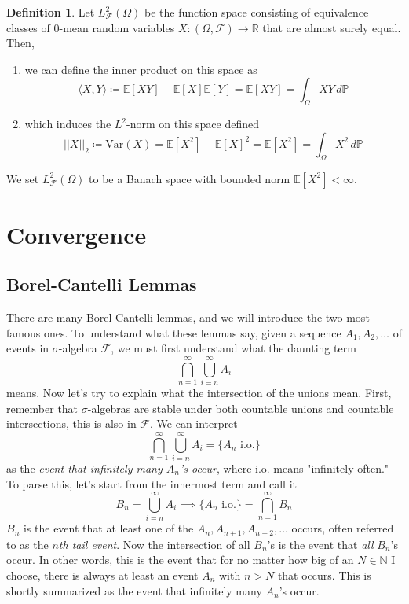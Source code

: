 \documentclass{article}
\theoremstyle{definition}
\theoremstyle{remark}
\theoremstyle{definition}
\newtheorem{definition}{Definition}[section]
\begin{document}
\begin{definition}
Let $L^2_\mathcal{F} (\Omega)$ be the function space consisting of equivalence classes of $0$-mean random variables $X: (\Omega, \mathcal{F}) \rightarrow \mathbb{R}$ that are almost surely equal. Then, 
\begin{enumerate}
    \item we can define the inner product on this space as 
    \[\langle X, Y \rangle \coloneqq \mathbb{E}[X Y] - \mathbb{E}[X] \mathbb{E}[Y] = \mathbb{E}[X Y] = \int_\Omega X Y \,d\mathbb{P}\]

    \item which induces the $L^2$-norm on this space defined 
    \[||X||_2 \coloneqq \mathrm{Var}(X) = \mathbb{E}[X^2] - \mathbb{E}[X]^2 = \mathbb{E}[X^2] = \int_\Omega X^2 \,d\mathbb{P}\]
\end{enumerate}
We set $L^2_\mathcal{F} (\Omega)$ to be a Banach space with bounded norm $\mathbb{E}[X^2] < \infty$. 
\end{definition}

\section{Convergence}

\subsection{Borel-Cantelli Lemmas}

There are many Borel-Cantelli lemmas, and we will introduce the two most famous ones. To understand what these lemmas say, given a sequence $A_1, A_2, \ldots$ of events in $\sigma$-algebra $\mathcal{F}$, we must first understand what the daunting term  
\[\bigcap_{n=1}^\infty \bigcup_{i = n}^\infty A_i\]
means. Now let's try to explain what the intersection of the unions mean. First, remember that $\sigma$-algebras are stable under both countable unions and countable intersections, this is also in $\mathcal{F}$. We can interpret 
\[\bigcap_{n=1}^\infty \bigcup_{i=n}^\infty A_i = \{ A_n \text{ i.o.}\} \]
as the \textit{event that infinitely many $A_n$'s occur}, where i.o. means "infinitely often." To parse this, let's start from the innermost term and call it 
\[B_n = \bigcup_{i=n}^\infty A_i \implies \{A_n \text{ i.o.}\} = \bigcap_{n=1}^\infty B_n\]
$B_n$ is the event that at least one of the $A_n, A_{n+1}, A_{n+2}, \ldots$ occurs, often referred to as the \textit{$n$th tail event}. Now the intersection of all $B_n$'s is the event that \textit{all} $B_n$'s occur. In other words, this is the event that for no matter how big of an $N \in \mathbb{N}$ I choose, there is always at least an event $A_n$ with $n > N$ that occurs. This is shortly summarized as the event that infinitely many $A_n$'s occur. 
\end{document}
